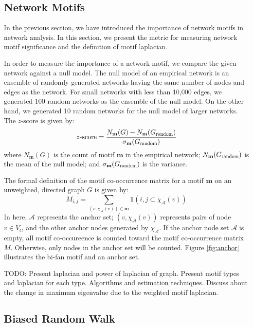 \documentclass{article}
\theoremstyle{definition}
\begin{document}
\subsection{Network Motifs}

In the previous section, we have introduced the importance of
network motifs in network analysis. In this section, we present
the metric for measuring network motif significance and the definition
of motif laplacian.

In order to measure the importance of a network motif, we compare
the given network against a null model. The null model of an empirical network 
is an ensemble of randomly generated networks having the same number of nodes and
edges as the network. For small networks with less than 10,000 edges, we
generated 100 random networks as the ensemble of the null model. On the other
hand, we generated 10 random networks for the null model of larger networks.
The $z\mbox{-score}$ is given by:
\begin{equation*}
z\mbox{-score} = \frac{N_\mathbf{m}(G)-N_\mathbf{m}(G_{\scalebox{0.75}{random}})}{\sigma_\mathbf{m}(G_{\scalebox{0.75}{random}})}
\end{equation*}
where $N_\mathbf{m}(G)$ is the count of motif $\mathbf{m}$ in the empirical
network; $N_\mathbf{m}(G_{\scalebox{0.75}{random}})$ is the mean of the
null model; and $\sigma_\mathbf{m}(G_{\scalebox{0.75}{random}})$ is the variance.

The formal definition of the motif co-occurrence matrix for a
motif $\mathbf{m}$ on an unweighted, directed graph $G$ is given by:
$$M_{i,j} = \sum_{(v, \chi_{\mathcal{A}}(v)) \in \mathbf{m}} \mathbf{1}({i,j} \subset \chi_\mathcal{A}(v))$$
In here, $\mathcal{A}$ represents the anchor set; $(v, \chi_{\mathcal{A}}(v))$ 
represents pairs of node $v \in V_G$ and the other anchor nodes generated by $\chi_\mathcal{A}$.
If the anchor node set $\mathcal{A}$ is empty, all motif co-occureence is
counted toward the motif co-occurrence matrix $M$. Otherwise, only nodes in
the anchor set will be counted. Figure \ref{fig:anchor} illustrates
the bi-fan motif and an anchor set.

TODO: Present laplacian and power of laplacian of graph. Present motif
types and laplacian for each type.
Algorithms and estimation techniques. Discuss about
the change in maximum eigenvalue due to the weighted
motif laplacian.

\subsection{Biased Random Walk}
\end{document}
